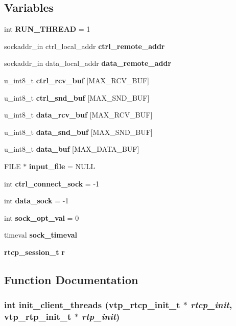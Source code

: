 \subsection*{Variables}
\begin{CompactItemize}
\item 
int {\bf RUN\_\-THREAD} = 1
\item 
sockaddr\_\-in ctrl\_\-local\_\-addr {\bf ctrl\_\-remote\_\-addr}
\item 
sockaddr\_\-in data\_\-local\_\-addr {\bf data\_\-remote\_\-addr}
\item 
u\_\-int8\_\-t {\bf ctrl\_\-rcv\_\-buf} [MAX\_\-RCV\_\-BUF]
\item 
u\_\-int8\_\-t {\bf ctrl\_\-snd\_\-buf} [MAX\_\-SND\_\-BUF]
\item 
u\_\-int8\_\-t {\bf data\_\-rcv\_\-buf} [MAX\_\-RCV\_\-BUF]
\item 
u\_\-int8\_\-t {\bf data\_\-snd\_\-buf} [MAX\_\-SND\_\-BUF]
\item 
u\_\-int8\_\-t {\bf data\_\-buf} [MAX\_\-DATA\_\-BUF]
\item 
FILE $\ast$ {\bf input\_\-file} = NULL
\item 
int {\bf ctrl\_\-connect\_\-sock} = -1
\item 
int {\bf data\_\-sock} = -1
\item 
int {\bf sock\_\-opt\_\-val} = 0
\item 
timeval {\bf sock\_\-timeval}
\item 
{\bf rtcp\_\-session\_\-t} {\bf r}
\end{CompactItemize}


\subsection{Function Documentation}
\subsubsection{\setlength{\rightskip}{0pt plus 5cm}int init\_\-client\_\-threads ({\bf vtp\_\-rtcp\_\-init\_\-t} $\ast$ {\em rtcp\_\-init}, {\bf vtp\_\-rtp\_\-init\_\-t} $\ast$ {\em rtp\_\-init})}\label{client_8c_a17}



